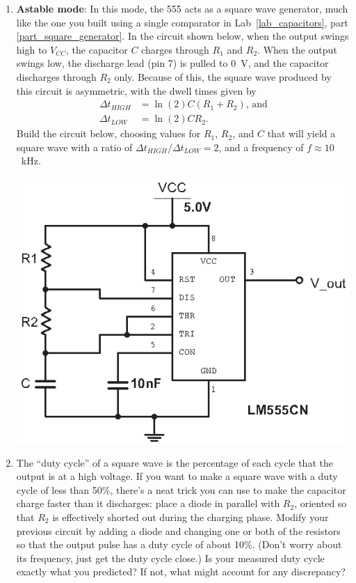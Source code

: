 \begin{enumerate}[wide]
\item \textbf{Astable mode}: In this mode, the 555 acts as a square wave generator, much like the one you built using a single comparator in Lab~\ref{lab_capacitors}, part \ref{part_square_generator}.  In the circuit shown below, when the output swings high to $V_{CC}$, the capacitor $C$ charges through $R_1$ and $R_2$.  When the output swings low, the discharge lead (pin 7) is pulled to 0~V, and the capacitor discharges through $R_2$ only.  Because of this, the square wave produced by this circuit is asymmetric, with the dwell times given by
\begin{align*}
\Delta t_{HIGH} &= \ln (2) C(R_1 + R_2) \textrm{, and} \\
\Delta t_{LOW} &=\ln (2) CR_2.
\end{align*}
Build the circuit below, choosing values for $R_1$, $R_2$, and $C$ that will yield a square wave with a ratio of 
$\Delta t_{HIGH} / \Delta t_{LOW} =2$, and a frequency of $f \approx 10$~kHz. \label{part_astable}
\begin{center}
\includegraphics{timers/astable_555.eps}
\end{center}

\item The ``duty cycle'' of a square wave is the percentage of each cycle that the output is at a high voltage.  If you want to make a square wave with a duty cycle of less than 50\%, there's a neat trick you can use to make the capacitor charge faster than it discharges: place a diode in parallel with $R_2$, oriented so that $R_2$ is effectively shorted out during the charging phase.  Modify your previous circuit by adding a diode and changing one or both of the resistors so that the output pulse has a duty cycle of about 10\%.  (Don't worry about its frequency, just get the duty cycle close.)  Is your measured duty cycle exactly what you predicted?  If not, what might account for any discrepancy? \label{part_square_wave_duty_cycle}


\end{enumerate}
